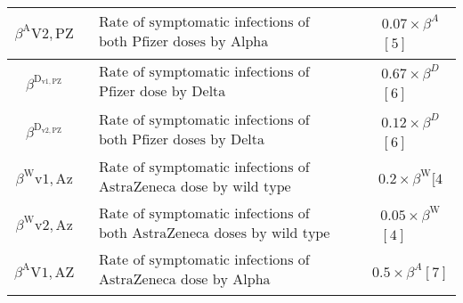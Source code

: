 \documentclass[10pt]{article}
\begin{document}
\begin{center}
\begin{tabular}{|c|c|c|}
\hline
$\beta^{\mathrm{A}} \mathrm{V} 2, \mathrm{PZ}$ & $\begin{array}{l}\text { Rate of symptomatic infections of individuals vaccinated with } \\ \text { both Pfizer doses by Alpha }\end{array}$ & $\begin{array}{l}0.07 \times \beta^{A} \\ {[5]}\end{array}$ \\
\hline
$\beta^{\mathrm{D}_{\mathrm{v} 1, \mathrm{PZ}}}$ & $\begin{array}{l}\text { Rate of symptomatic infections of individuals vaccinated with one } \\ \text { Pfizer dose by Delta }\end{array}$ & $\begin{array}{l}0.67 \times \beta^{D} \\ {[6]}\end{array}$ \\
\hline
$\beta^{\mathrm{D}_{\mathrm{v} 2, \mathrm{PZ}}}$ & $\begin{array}{l}\text { Rate of symptomatic infections of individuals vaccinated with } \\ \text { both Pfizer doses by Delta }\end{array}$ & $\begin{array}{l}0.12 \times \beta^{D} \\ {[6]}\end{array}$ \\
\hline
$\beta^{\mathrm{W}} \mathrm{v1,Az}$ & $\begin{array}{l}\text { Rate of symptomatic infections of individuals vaccinated with one } \\ \text { AstraZeneca dose by wild type }\end{array}$ & $0.2 \times \beta^{\mathrm{W}}[4$ \\
\hline
$\beta^{\mathrm{W}} \mathrm{v} 2, \mathrm{Az}$ & $\begin{array}{l}\text { Rate of symptomatic infections of individuals vaccinated with } \\ \text { both AstraZeneca doses by wild type }\end{array}$ & $\begin{array}{l}0.05 \times \beta^{\mathrm{W}} \\ {[4]}\end{array}$ \\
\hline
$\beta^{\mathrm{A}} \mathrm{V} 1, \mathrm{AZ}$ & $\begin{array}{l}\text { Rate of symptomatic infections of individuals vaccinated with one } \\ \text { AstraZeneca dose by Alpha }\end{array}$ & $0.5 \times \beta^{A}[7]$ \\

\end{tabular}
\end{center}
\end{document}
